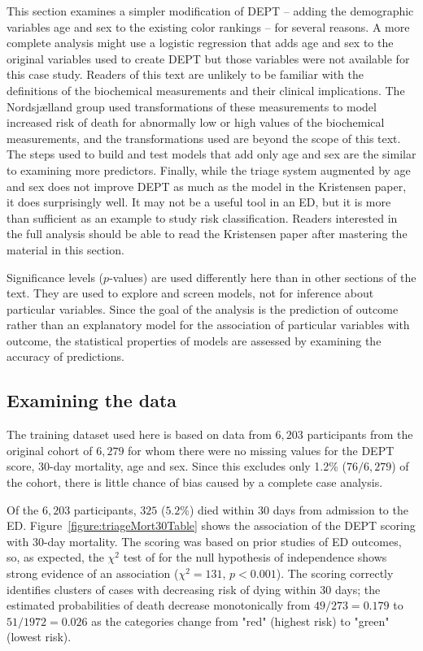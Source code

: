 This section examines a simpler modification of DEPT -- adding the demographic variables age and sex to the existing color rankings -- for several reasons. A more complete analysis might use a logistic regression that adds age and sex to the original variables used to create DEPT but those variables were not available for this case study.   Readers of this text are unlikely to be familiar with the definitions of the biochemical measurements and their clinical implications. The Nordsj{\ae}lland group used transformations of these measurements to model increased risk of death for abnormally low or high values of the biochemical measurements, and the transformations used are beyond the scope of this text. The steps used to build and test models that add only age and sex are the similar to examining more predictors. Finally, while the triage system augmented by age and sex does not improve DEPT as much as the model in the Kristensen paper, it does surprisingly well.  It may not be a useful tool in an ED, but it is more than sufficient as an example to study risk classification.    Readers interested in the full analysis should be able to read the Kristensen paper after mastering the material in this section.

Significance levels ($p$-values) are used differently here than in other sections of the text.  They are used to explore and screen models, not for inference about particular variables.  Since the goal of the analysis is the prediction of outcome rather than an explanatory model for the association of particular variables with outcome, the statistical properties of models are assessed by examining the accuracy of predictions.  


\subsection{Examining the data}
\label{section:examiningDataDanishED}

The training dataset used here is based on data from $6,203$ participants from the original cohort of $6,279$ for whom there were no missing values for the DEPT score, 30-day mortality, age and sex.  Since this excludes only 1.2\% ($76/6,279$) of the cohort, there is little chance of bias caused by a complete case analysis.  

Of the $6,203$ participants, $325$ ($5.2\%$) died within 30 days from admission to the ED.  Figure~\ref{figure:triageMort30Table} shows the association of the DEPT scoring with 30-day mortality.   The scoring was based on prior studies of ED outcomes, so, as expected, the $\chi^2$ test of for the null hypothesis of independence shows strong evidence of an association ($\chi^2 = 131$, $p < 0.001$).  The scoring correctly identifies clusters of cases with decreasing risk of dying within 30 days; the estimated probabilities of death decrease monotonically from $ 49/273 =  0.179$ to $ 51/1972 = 0.026$ as the categories change from "red" (highest risk) to "green" (lowest risk).

